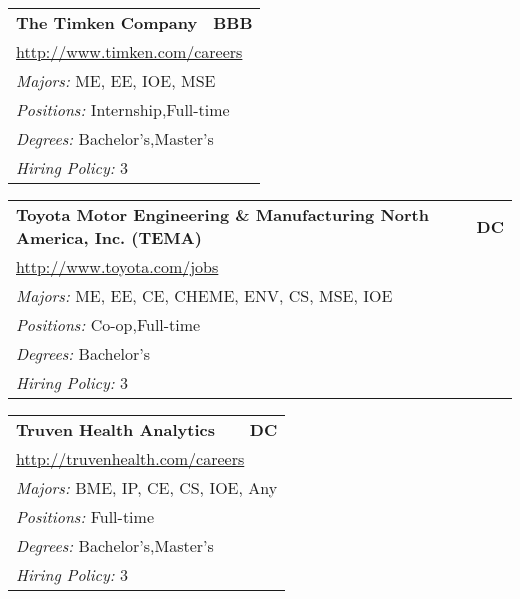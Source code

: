 \documentclass[twoside]{article}
\begin{document}
\begin{center}
\begin{multicols}{3}
\begin{FlushLeft}
\begin{minipage}{\columnwidth}
\end{minipage}
 
\begin{minipage}{\columnwidth}\begin{tabularx}{.95\columnwidth}{Xr}
                 {\Large\bf The Timken Company} & {\Large\bf BBB}\\
    \multicolumn{2}{p{.95\columnwidth}}{\url{http://www.timken.com/careers}}\\
    \multicolumn{2}{p{.95\columnwidth}}{\emph{Majors:} ME, EE, IOE, MSE}\\
    \multicolumn{2}{p{.95\columnwidth}}{\emph{Positions:} Internship,Full-time}\\
    \multicolumn{2}{p{.95\columnwidth}}{\emph{Degrees:} Bachelor's,Master's}\\
    \multicolumn{2}{p{.95\columnwidth}}{\emph{Hiring Policy:} 3}\\
    \end{tabularx}
    
\end{minipage}
 
\begin{minipage}{\columnwidth}\begin{tabularx}{.95\columnwidth}{Xr}
                 {\Large\bf Toyota Motor Engineering \& Manufacturing North America, Inc. (TEMA)} & {\Large\bf DC}\\
    \multicolumn{2}{p{.95\columnwidth}}{\url{http://www.toyota.com/jobs}}\\
    \multicolumn{2}{p{.95\columnwidth}}{\emph{Majors:} ME, EE, CE, CHEME, ENV, CS, MSE, IOE}\\
    \multicolumn{2}{p{.95\columnwidth}}{\emph{Positions:} Co-op,Full-time}\\
    \multicolumn{2}{p{.95\columnwidth}}{\emph{Degrees:} Bachelor's}\\
    \multicolumn{2}{p{.95\columnwidth}}{\emph{Hiring Policy:} 3}\\
    \end{tabularx}
    
\end{minipage}
 
\begin{minipage}{\columnwidth}\begin{tabularx}{.95\columnwidth}{Xr}
                 {\Large\bf Truven Health Analytics} & {\Large\bf DC}\\
    \multicolumn{2}{p{.95\columnwidth}}{\url{http://truvenhealth.com/careers}}\\
    \multicolumn{2}{p{.95\columnwidth}}{\emph{Majors:} BME, IP, CE, CS, IOE, Any}\\
    \multicolumn{2}{p{.95\columnwidth}}{\emph{Positions:} Full-time}\\
    \multicolumn{2}{p{.95\columnwidth}}{\emph{Degrees:} Bachelor's,Master's}\\
    \multicolumn{2}{p{.95\columnwidth}}{\emph{Hiring Policy:} 3}\\
    \end{tabularx}
    

\end{minipage}
\end{FlushLeft}
\end{multicols}
\end{center}
\end{document}

